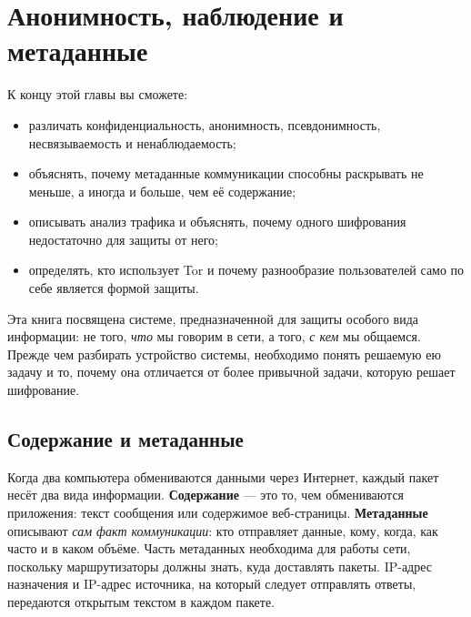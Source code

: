 \chapter{Анонимность, наблюдение и метаданные}\label{cap:01-anonimato}

\begin{obiettivi}
К концу этой главы вы сможете:
\begin{itemize}[nosep]
  \item различать конфиденциальность, анонимность, псевдонимность, несвязываемость и ненаблюдаемость;
  \item объяснять, почему метаданные коммуникации способны раскрывать не меньше, а иногда и больше, чем её содержание;
  \item описывать анализ трафика и объяснять, почему одного шифрования недостаточно для защиты от него;
  \item определять, кто использует Tor и почему разнообразие пользователей само по себе является формой защиты.
\end{itemize}
\end{obiettivi}

Эта книга посвящена системе, предназначенной для защиты особого вида информации: не того, \emph{что} мы говорим в сети, а того, \emph{с кем} мы общаемся. Прежде чем разбирать устройство системы, необходимо понять решаемую ею задачу и то, почему она отличается от более привычной задачи, которую решает шифрование.

\section{Содержание и метаданные}\label{sec:anon-metadati}

Когда два компьютера обмениваются данными через Интернет, каждый пакет несёт два вида информации. \textbf{Содержание} --- это то, чем обмениваются приложения: текст сообщения или содержимое веб-страницы. \textbf{Метаданные} описывают \emph{сам факт коммуникации}: кто отправляет данные, кому, когда, как часто и в каком объёме. Часть метаданных необходима для работы сети, поскольку маршрутизаторы должны знать, куда доставлять пакеты. IP-адрес назначения и IP-адрес источника, на который следует отправлять ответы, передаются открытым текстом в каждом пакете.

